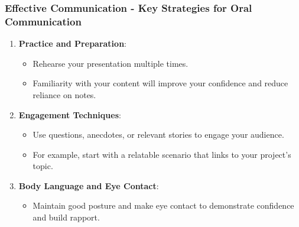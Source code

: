 \documentclass[aspectratio=169]{beamer}
\begin{document}
\begin{frame}[fragile]
  \frametitle{Effective Communication - Key Strategies for Oral Communication}
  \begin{enumerate}
    \item \textbf{Practice and Preparation}:
    \begin{itemize}
        \item Rehearse your presentation multiple times.
        \item Familiarity with your content will improve your confidence and reduce reliance on notes.
    \end{itemize}
    
    \item \textbf{Engagement Techniques}:
    \begin{itemize}
        \item Use questions, anecdotes, or relevant stories to engage your audience.
        \item For example, start with a relatable scenario that links to your project's topic.
    \end{itemize}
    
    \item \textbf{Body Language and Eye Contact}:
    \begin{itemize}
        \item Maintain good posture and make eye contact to demonstrate confidence and build rapport.
    \end{itemize}
  \end{enumerate}
\end{frame}
\end{document}
